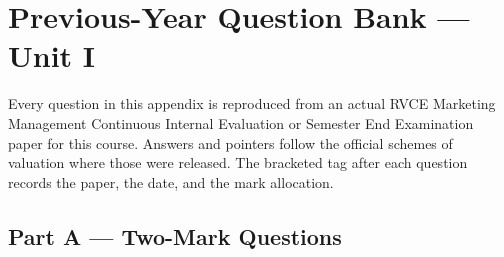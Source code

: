 \documentclass{MMTextbook}
\begin{document}
\chapter{Previous-Year Question Bank --- Unit I}

Every question in this appendix is reproduced from an actual RVCE Marketing
Management Continuous Internal Evaluation or Semester End Examination paper for
this course. Answers and pointers follow the official schemes of valuation where
those were released. The bracketed tag after each question records the paper,
the date, and the mark allocation.

\section*{Part A --- Two-Mark Questions}
\end{document}
